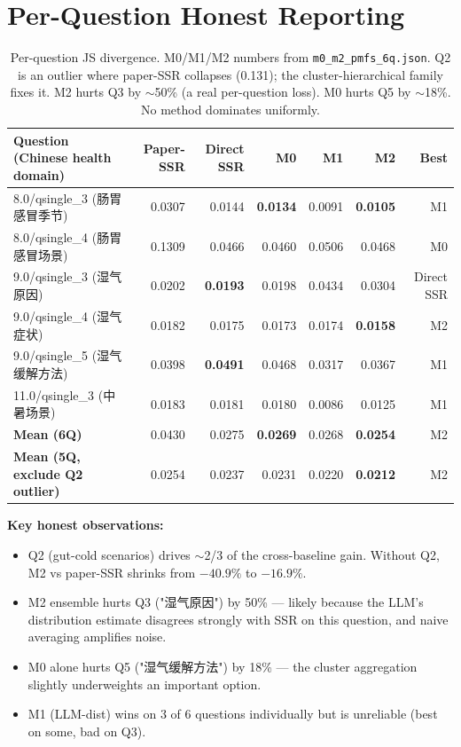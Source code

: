 \documentclass[10pt,a4paper]{article}
\newcommand{\good}[1]{\textcolor{green!50!black}{\textbf{#1}}}
\newcommand{\bad}[1]{\textcolor{red!60!black}{#1}}
\begin{document}
\section{Per-Question Honest Reporting}

\begin{table}[H]
\centering
\small
\begin{tabular}{l r r r r r r}
\toprule
\textbf{Question (Chinese health domain)} & \textbf{Paper-SSR} & \textbf{Direct SSR} & \textbf{M0} & \textbf{M1} & \textbf{M2} & \textbf{Best} \\
\midrule
8.0/qsingle\_3 (肠胃感冒季节) & 0.0307 & 0.0144 & \good{0.0134} & 0.0091 & \good{0.0105} & M1 \\
8.0/qsingle\_4 (肠胃感冒场景) & \bad{0.1309} & 0.0466 & 0.0460 & 0.0506 & 0.0468 & M0 \\
9.0/qsingle\_3 (湿气原因) & 0.0202 & \good{0.0193} & 0.0198 & 0.0434 & \bad{0.0304} & Direct SSR \\
9.0/qsingle\_4 (湿气症状) & 0.0182 & 0.0175 & 0.0173 & 0.0174 & \good{0.0158} & M2 \\
9.0/qsingle\_5 (湿气缓解方法) & 0.0398 & \good{0.0491} & \bad{0.0468} & 0.0317 & 0.0367 & M1 \\
11.0/qsingle\_3 (中暑场景) & 0.0183 & 0.0181 & 0.0180 & 0.0086 & 0.0125 & M1 \\
\midrule
\textbf{Mean (6Q)} & 0.0430 & 0.0275 & \good{0.0269} & 0.0268 & \good{0.0254} & M2 \\
\textbf{Mean (5Q, exclude Q2 outlier)} & 0.0254 & 0.0237 & 0.0231 & 0.0220 & \good{0.0212} & M2 \\
\bottomrule
\end{tabular}
\caption{Per-question JS divergence. M0/M1/M2 numbers from \texttt{m0\_m2\_pmfs\_6q.json}. Q2 is an outlier where paper-SSR collapses (0.131); the cluster-hierarchical family fixes it. M2 hurts Q3 by $\sim$50\% (a real per-question loss). M0 hurts Q5 by $\sim$18\%. No method dominates uniformly.}
\end{table}

\textbf{Key honest observations:}
\begin{itemize}[leftmargin=*,itemsep=0pt]
\item Q2 (gut-cold scenarios) drives $\sim$2/3 of the cross-baseline gain. Without Q2, M2 vs paper-SSR shrinks from $-40.9\%$ to $-16.9\%$.
\item M2 ensemble hurts Q3 ("湿气原因") by 50\% — likely because the LLM's distribution estimate disagrees strongly with SSR on this question, and naive averaging amplifies noise.
\item M0 alone hurts Q5 ("湿气缓解方法") by 18\% — the cluster aggregation slightly underweights an important option.
\item M1 (LLM-dist) wins on 3 of 6 questions individually but is unreliable (best on some, bad on Q3).
\end{itemize}
\end{document}
